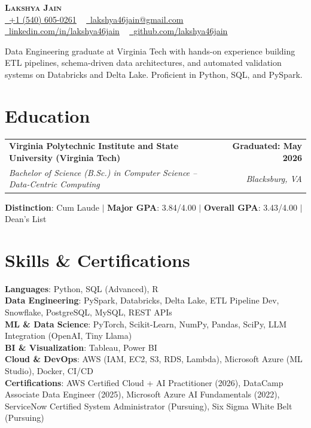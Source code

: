 \documentclass[letterpaper,11pt]{article}
\makeatletter
\newcommand{\resumeEducationSubheading}[4]{
  \vspace{-2pt}\item
    \begin{tabular*}{1.0\textwidth}[t]{l@{\extracolsep{\fill}}r}
      \textbf{#1} & \textbf{\small #2} \\
      \textit{\small#3} & \textit{\small #4} \\
    \end{tabular*}\vspace{-7pt}
}
\newcommand{\resumeSubHeadingListStart}{\begin{itemize}[leftmargin=0.0in, label={}]}
\newcommand{\resumeSubHeadingListEnd}{\end{itemize}}
\makeatother
\begin{document}
\begin{center}
    \textbf{\Huge \scshape Lakshya Jain} \\ \vspace{7.5pt}
    \small{
        \href{tel:1-540-605-0261}{\faPhone\ \underline{+1 (540) 605-0261}} ~
        \href{mailto:lakshya46jain@gmail.com}{\faEnvelope\ \underline{lakshya46jain@gmail.com}} ~
        \href{https://linkedin.com/in/lakshya46jain}{\faLinkedin\ \underline{linkedin.com/in/lakshya46jain}} ~
        \href{https://github.com/lakshya46jain}{\faGithub\ \underline{github.com/lakshya46jain}}
        }
    \vspace{-2.5pt}
\end{center}

\vspace{-4pt}
\begin{center}
    \small{Data Engineering graduate at Virginia Tech with hands-on experience building ETL pipelines, schema-driven data architectures, and automated validation systems on Databricks and Delta Lake. Proficient in Python, SQL, and PySpark.}
\end{center}

\section{Education}
    \resumeSubHeadingListStart
        \resumeEducationSubheading
            {Virginia Polytechnic Institute and State University (Virginia Tech)}
            {Graduated: May 2026}
            {Bachelor of Science (B.Sc.) in Computer Science -- Data-Centric Computing}
            {Blacksburg, VA}
            \small{\item[]{\textbf{Distinction}{: Cum Laude} $|$ \textbf{Major GPA}{: 3.84/4.00} $|$ \textbf{Overall GPA}{: 3.43/4.00} $|$ Dean's List}}
    \resumeSubHeadingListEnd

\section{Skills \& Certifications}
    \begin{itemize}[leftmargin=0in, label={}]
        \small{\item{
            \textbf{Languages}{: Python, SQL (Advanced), R} \\
            \textbf{Data Engineering}{: PySpark, Databricks, Delta Lake, ETL Pipeline Dev, Snowflake, PostgreSQL, MySQL, REST APIs} \\
            \textbf{ML \& Data Science}{: PyTorch, Scikit-Learn, NumPy, Pandas, SciPy, LLM Integration (OpenAI, Tiny Llama)} \\
            \textbf{BI \& Visualization}{: Tableau, Power BI} \\
            \textbf{Cloud \& DevOps}{: AWS (IAM, EC2, S3, RDS, Lambda), Microsoft Azure (ML Studio), Docker, CI/CD} \\
            \textbf{Certifications}{: AWS Certified Cloud + AI Practitioner (2026), DataCamp Associate Data Engineer (2025), Microsoft Azure AI Fundamentals (2022), ServiceNow Certified System Administrator (Pursuing), Six Sigma White Belt (Pursuing)} \\
        }}
    \end{itemize}
\end{document}

